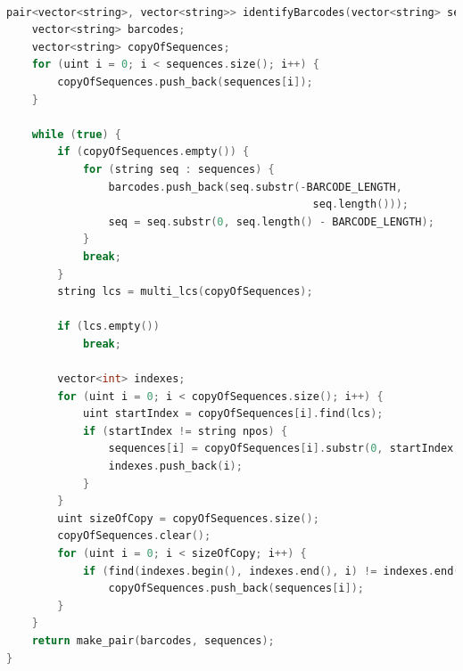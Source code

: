 \documentclass[a4paper,10pt]{article}
\begin{document}
\begin{lstlisting}[language=c++, caption=Algorithm to identify the barcodes and the sequences multiplexed, label={lst12:label}]

pair<vector<string>, vector<string>> identifyBarcodes(vector<string> sequences) {
    vector<string> barcodes;
    vector<string> copyOfSequences;
    for (uint i = 0; i < sequences.size(); i++) {
        copyOfSequences.push_back(sequences[i]);
    }

    while (true) {
        if (copyOfSequences.empty()) {
            for (string seq : sequences) {
                barcodes.push_back(seq.substr(-BARCODE_LENGTH, 
                                                seq.length()));
                seq = seq.substr(0, seq.length() - BARCODE_LENGTH);
            }
            break;
        }
        string lcs = multi_lcs(copyOfSequences);

        if (lcs.empty())
            break;

        vector<int> indexes;
        for (uint i = 0; i < copyOfSequences.size(); i++) {
            uint startIndex = copyOfSequences[i].find(lcs);
            if (startIndex != string npos) {
                sequences[i] = copyOfSequences[i].substr(0, startIndex + 1);
                indexes.push_back(i);
            }
        }
        uint sizeOfCopy = copyOfSequences.size();
        copyOfSequences.clear();
        for (uint i = 0; i < sizeOfCopy; i++) {
            if (find(indexes.begin(), indexes.end(), i) != indexes.end())
                copyOfSequences.push_back(sequences[i]);
        }
    }
    return make_pair(barcodes, sequences);
}

\end{lstlisting}
\end{document}
